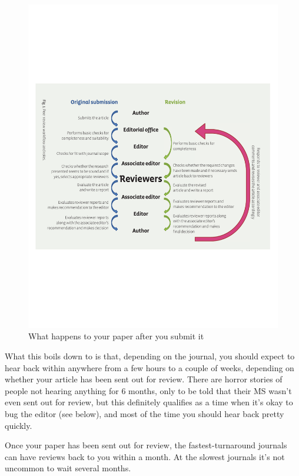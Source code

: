 \documentclass[11pt,]{article}
\begin{document}
\begin{figure}[htbp]
\centering
\includegraphics{BES_publishing_flowchart.pdf}
\caption{What happens to your paper after you submit it}
\end{figure}

What this boils down to is that, depending on the journal, you should
expect to hear back within anywhere from a few hours to a couple of
weeks, depending on whether your article has been sent out for review.
There are horror stories of people not hearing anything for 6 months,
only to be told that their MS wasn't even sent out for review, but this
definitely qualifies as a time when it's okay to bug the editor (see
below), and most of the time you should hear back pretty quickly.

Once your paper has been sent out for review, the fastest-turnaround
journals can have reviews back to you within a month. At the slowest
journals it's not uncommon to wait several months.
\end{document}
